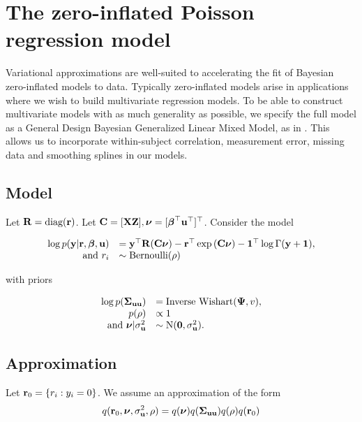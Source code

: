 \documentclass{article}[12pt]
\begin{document}
\section{The zero-inflated Poisson regression model}

Variational approximations are well-suited to accelerating the fit of Bayesian zero-inflated models
to data. Typically zero-inflated models arise in applications where we wish to build multivariate regression 
models. To be able to construct multivariate models with as much generality as possible, we specify the full
model as a General Design Bayesian Generalized Linear Mixed Model, as in \citep{zhao06}. This allows us to 
incorporate within-subject correlation, measurement error, missing data and smoothing splines in our models.



\subsection{Model}
Let ${\bf R} = \text{diag}{({\bf r})}$. Let ${\bf C} = [{\bf X} {\bf Z}], {\boldsymbol \nu} = [{\boldsymbol \beta}^\top {\bf u}^\top]^\top$. Consider the
model

$$
\begin{array}{rl}
\log{p({\bf y}|{\bf r}, {\boldsymbol\beta}, {\bf u})} &= {\bf y}^\top {\bf R} ({\bf C}{\boldsymbol \nu}) - {\bf r}^\top \exp{({\bf C}{\boldsymbol\nu})} - {\bf 1}^\top \log{\Gamma{({\bf y}+ {\bf1})}}, \\
\mbox{ and }
r_i &\sim \text{Bernoulli}(\rho) \\
\end{array}
$$

with priors

$$ 
\begin{array}{rl}
\log{p({\boldsymbol\Sigma}_{{\bf u}{\bf u}})} &= \text{Inverse Wishart}({\boldsymbol \Psi}, v),\\
p(\rho) &\propto 1 \\
\mbox{ and } {\boldsymbol\nu}|\sigma_{\bf u}^2 &\sim \mbox{N}({\bf 0}, \sigma_{\bf u}^2). \\
\end{array}
$$

\subsection{Approximation}
Let ${\bf r}_0 = \{ r_i : y_i = 0 \}$.
We assume an approximation of the form
$$
q({\bf r}_0, {\boldsymbol \nu}, \sigma_{{\bf u}}^2, \rho) = q({\boldsymbol \nu}) q({\boldsymbol \Sigma}_{{\bf u} {\bf u}}) q(\rho) q({\bf r}_0) \\
$$
\end{document}
